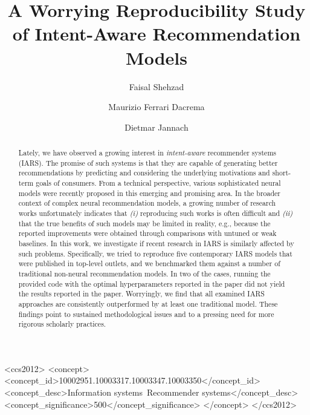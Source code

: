 \documentclass[sigconf,natbib=true,nonacm]{acmart}
\begin{document}
\title{A Worrying Reproducibility Study of Intent-Aware Recommendation Models}

\author{Faisal Shehzad}

\author{Maurizio Ferrari Dacrema}

\author{Dietmar Jannach}

\renewcommand{\shortauthors}{Shehzad et al.}

\begin{abstract}
Lately, we have observed a growing interest in \emph{intent-aware} recommender systems (IARS). The promise of such systems is that they are capable of generating better recommendations by predicting and considering the underlying motivations and short-term goals of consumers. From a technical perspective, various sophisticated neural models were recently proposed in this emerging and promising area. In the broader context of complex neural recommendation models, a growing number of research works unfortunately indicates that \emph{(i)} reproducing such works is often difficult and \emph{(ii)} that the true benefits of such models may be limited in reality, e.g., because the reported improvements were obtained through comparisons with untuned or weak baselines. In this work, we investigate if recent research in IARS is similarly affected by such problems. Specifically, we tried to reproduce five contemporary IARS models that were published in top-level outlets, and we benchmarked them against a number of traditional non-neural recommendation models.
In two of the cases, running the provided code with the optimal hyperparameters reported in the paper did not yield the results reported in the paper. Worryingly, we find that all examined IARS approaches are consistently outperformed by at least one traditional model. These findings point to sustained methodological issues and to a pressing need for more rigorous scholarly practices.
\end{abstract}


\begin{CCSXML}
<ccs2012>
   <concept>
       <concept_id>10002951.10003317.10003347.10003350</concept_id>
       <concept_desc>Information systems~Recommender systems</concept_desc>
       <concept_significance>500</concept_significance>
       </concept>
 </ccs2012>
\end{CCSXML}
\end{document}
